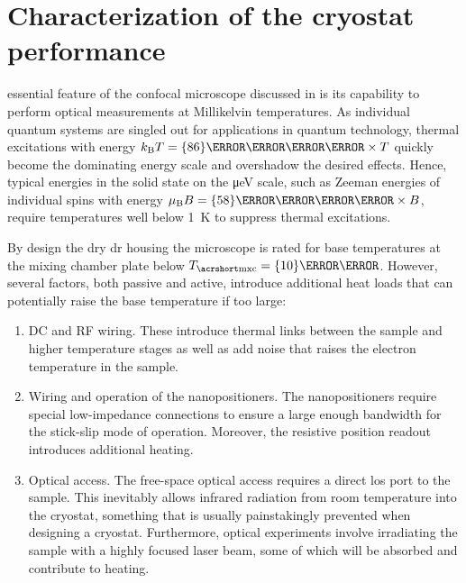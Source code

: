 \chapter{Characterization of the cryostat performance}\label{ch:setup:cooling}
 essential feature of the confocal microscope discussed in \thethesis is its capability to perform optical measurements at Millikelvin temperatures.
As individual quantum systems are singled out for applications in quantum technology, thermal excitations with energy $\kb T = \qty{86}{\micro\eV\per\kelvin}\times T$ quickly become the dominating energy scale and overshadow the desired effects.
Hence, typical energies in the solid state on the \unit{\micro\eV} scale, such as Zeeman energies of individual spins with energy $\mub B = \qty{58}{\micro\eV\per\tesla}\times B$, require temperatures well below \qty{1}{\kelvin} to suppress thermal excitations.

By design the \odin dry \gls{dr} housing the microscope is rated for base temperatures at the mixing chamber plate below $\Tmxc=\qty{10}{\milli\kelvin}$.
However, several factors, both passive and active, introduce additional heat loads that can potentially raise the base temperature if too large:
\begin{enumerate}
    \item \label{itm:setup:cooling:wiring}
    DC and RF wiring.
    These introduce thermal links between the sample and higher temperature stages as well as add noise that raises the electron temperature in the sample.
    \item \label{itm:setup:cooling:positioners}
    Wiring and operation of the \positioner nanopositioners.
    The nanopositioners require special low-impedance connections to ensure a large enough bandwidth for the stick-slip mode of operation.
    Moreover, the resistive position readout introduces additional heating.
    \item \label{itm:setup:cooling:optical}
    Optical access.
    The free-space optical access requires a direct \gls{los} port to the sample.
    This inevitably allows infrared radiation from room temperature into the cryostat, something that is usually painstakingly prevented when designing a cryostat.
    Furthermore, optical experiments involve irradiating the sample with a highly focused laser beam, some of which will be absorbed and contribute to heating.
\end{enumerate}

